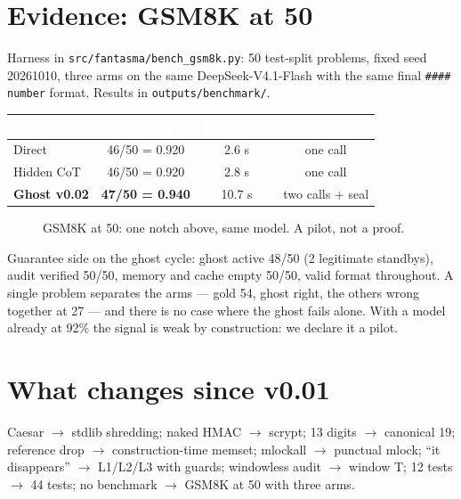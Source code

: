\documentclass[11pt,a4paper]{article}
\begin{document}
\section{Evidence: GSM8K at 50}
Harness in \texttt{src/fantasma/bench\_gsm8k.py}: 50 test-split problems, fixed seed
20261010, three arms on the same DeepSeek-V4.1-Flash with the same final
\texttt{\#\#\#\# number} format. Results in \texttt{outputs/benchmark/}.

\begin{center}
\begin{tabular}{lccc}
\rowcolor{ghostblue}\textcolor{white}{Arm} & \textcolor{white}{Accuracy} & \textcolor{white}{Mean time} & \textcolor{white}{Notes} \\
\midrule
Direct & 46/50 = 0.920 & 2.6 s & one call \\
Hidden CoT & 46/50 = 0.920 & 2.8 s & one call \\
\rowcolor{palegreen}\textbf{Ghost v0.02} & \textbf{47/50 = 0.940} & 10.7 s & two calls + seal \\
\bottomrule
\end{tabular}
\end{center}

\begin{figure}[h]
\centering
{}
\caption{GSM8K at 50: one notch above, same model. A pilot, not a proof.}
\end{figure}

Guarantee side on the ghost cycle: ghost active 48/50 (2 legitimate standbys),
audit verified 50/50, memory and cache empty 50/50, valid format throughout.
A single problem separates the arms --- gold 54, ghost right, the others wrong
together at 27 --- and there is no case where the ghost fails alone. With a model
already at 92\% the signal is weak by construction: we declare it a pilot.

\section{What changes since v0.01}
Caesar $\to$ stdlib shredding; naked HMAC $\to$ scrypt; 13 digits $\to$ canonical 19;
reference drop $\to$ construction-time memset; mlockall $\to$ punctual mlock;
``it disappears'' $\to$ L1/L2/L3 with guards; windowless audit $\to$ window T;
12 tests $\to$ 44 tests; no benchmark $\to$ GSM8K at 50 with three arms.
\end{document}
